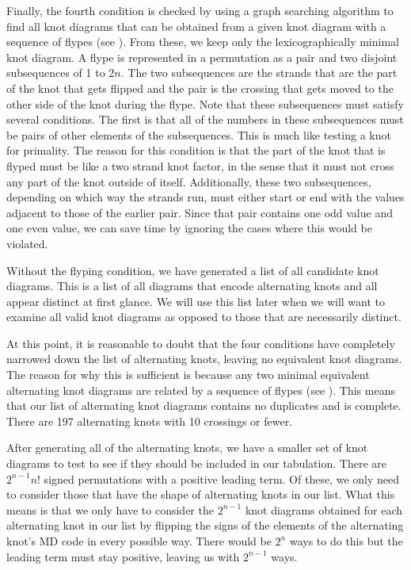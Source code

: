 \begin{paper}
Finally, the fourth condition is checked by using a graph searching algorithm to
find all knot diagrams that can be obtained from a given knot diagram with a
sequence of flypes (see \figMoves).
From these, we keep only the lexicographically minimal knot diagram.
A flype is represented in a permutation as a pair and two disjoint subsequences
of 1 to $2n$.
The two subsequences are the strands that are the part of the knot that gets
flipped and the pair is the crossing that gets moved to the other side of the
knot during the flype.
Note that these subsequences must satisfy several conditions.
The first is that all of the numbers in these subsequences must be pairs of
other elements of the subsequences.
This is much like testing a knot for primality.
The reason for this condition is that the part of the knot that is flyped must
be like a two strand knot factor, in the sense that it must not cross any part
of the knot outside of itself.
Additionally, these two subsequences, depending on which way the strands run,
must either start or end with the values adjacent to those of the earlier pair.
Since that pair contains one odd value and one even value, we can save time by
ignoring the cases where this would be violated.


Without the flyping condition, we have generated a list of all candidate knot
diagrams.
This is a list of all diagrams that encode alternating knots and all appear
distinct at first glance.
We will use this list later when we will want to examine all valid knot diagrams
as opposed to those that are necessarily distinct.


At this point, it is reasonable to doubt that the four conditions have
completely narrowed down the list of alternating knots, leaving no equivalent
knot diagrams.
The reason for why this is sufficient is because any two minimal equivalent
alternating knot diagrams are related by a sequence of flypes (see
\cite{flype}).
This means that our list of alternating knot diagrams contains no duplicates and
is complete.
There are 197 alternating knots with 10 crossings or fewer.



After generating all of the alternating knots, we have a smaller set of knot
diagrams to test to see if they should be included in our tabulation.
There are $2^{n-1}n!$ signed permutations with a positive leading term.
Of these, we only need to consider those that have the shape of alternating
knots in our list.
What this means is that we only have to consider the $2^{n-1}$ knot diagrams
obtained for each alternating knot in our list by flipping the signs of the
elements of the alternating knot's MD code in every possible way.
There would be $2^n$ ways to do this but the leading term must stay positive,
leaving us with $2^{n-1}$ ways.


\end{paper}
